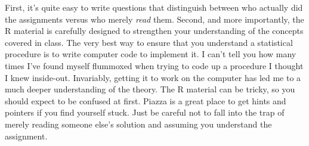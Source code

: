 \documentclass[12pt,letterpaper]{article}
\begin{document}
First, it's quite easy to write questions that distinguish between who actually did the assignments versus who merely \emph{read} them. Second, and more importantly, the R material is carefully designed to strengthen your understanding of the concepts covered in class. The very best way to ensure that you understand a statistical procedure is to write computer code to implement it. I can't tell you how many times I've found myself flummoxed when trying to code up a procedure I thought I knew inside-out. Invariably, getting it to work on the computer has led me to a much deeper understanding of the theory. The R material can be tricky, so you should expect to be confused at first. Piazza is a great place to get hints and pointers if you find yourself stuck. Just be careful not to fall into the trap of merely reading someone else's solution and assuming you understand the assignment.
\end{document}
